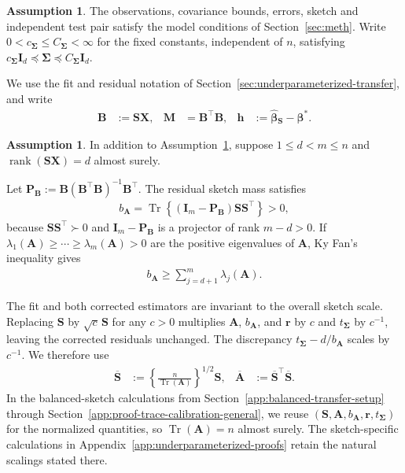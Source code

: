 \documentclass{article}
\theoremstyle{plain}
\theoremstyle{definition}
\newtheorem{assumption}[theorem]{Assumption}
\theoremstyle{definition}
\DeclareMathOperator{\trace}{Tr}
\DeclareMathOperator{\rank}{rank}
\def\mathbold{\boldsymbol}
\def\cal{\mathcal}
\def\bA{\mathbold{A}}\def\calA{{\cal A}}\def\scrA{{\mathscr A}}\def\Ahat{\widehat{A}}\def\Atil{{\widetilde A}}
\def\bB{\mathbold{B}}\def\calB{{\cal B}}\def\scrB{{\mathscr B}}\def\Bhat{\widehat{B}}\def\Btil{{\widetilde B}}
\def\bh{\mathbold{h}}\def\hhat{\widehat{h}}\def\htil{\widetilde{h}}
\def\bI{\mathbold{I}}\def\hbI{{\widehat{\bI}}}\def\tbI{{\widetilde{\bI}}}
\def\bM{\mathbold{M}}\def\hbM{{\widehat{\bM}}}\def\tbM{{\widetilde{\bM}}}
\def\bP{\mathbold{P}}\def\hbP{{\widehat{\bP}}}\def\tbP{{\widetilde{\bP}}}
\def\br{\mathbold{r}}\def\rhat{\widehat{r}}\def\rtil{\widetilde{r}}\def\rbar{{\overline r}}
\def\bS{\mathbold{S}}\def\hbS{{\widehat{\bS}}}\def\tbS{{\widetilde{\bS}}}
\def\bX{\mathbold{X}}\def\hbX{{\widehat{\bX}}}\def\tbX{{\tilde{\bX}}}\def\bXbar{{\overline \bX}}
\def\bbeta{\mathbold{\beta}}\def\betahat{\widehat{\beta}}\def\hbeta{\widehat{\beta}}
\def\hbbeta{\hat{\bbeta}{}}
\def\bSigma{\mathbold{\Sigma}}\def\hbSigma{{\widehat{\bSigma}}}
\begin{document}
\begin{assumption}
\label{assu:model-sketch}
The observations, covariance bounds, errors, sketch and independent test
pair satisfy the model conditions of Section~\ref{sec:meth}. Write
$0<c_{\bSigma}\leq C_{\bSigma}<\infty$ for the fixed constants,
independent of $n$, satisfying
$c_{\bSigma}\bI_d\preceq\bSigma\preceq C_{\bSigma}\bI_d$.
\end{assumption}
We use the fit and residual notation of
Section~\ref{sec:underparameterized-transfer}, and write
\begin{align*}
    \bB&:=\bS\bX,
    &\bM&=\bB^\top\bB,
    &\bh&:=\hbbeta_{\bS}-\bbeta^*.
\end{align*}
\begin{assumption}
\label{assu:noninterpolating}
In addition to Assumption~\ref{assu:model-sketch}, suppose
$1\leq d<m\leq n$ and $\rank(\bS\bX)=d$ almost surely.
\end{assumption}
Let $\bP_{\bB}:=\bB(\bB^\top\bB)^{-1}\bB^\top$.
The residual sketch mass satisfies
\begin{align*}
    b_{\bA}
    =\trace\!\left\{(\bI_m-\bP_{\bB})\bS\bS^\top\right\}>0,
\end{align*}
because $\bS\bS^\top\succ0$ and $\bI_m-\bP_{\bB}$ is a projector
of rank $m-d>0$. If
$\lambda_1(\bA)\geq\cdots\geq\lambda_m(\bA)>0$ are the positive
eigenvalues of $\bA$, Ky Fan's inequality gives
\begin{align}
    b_{\bA}\geq\sum_{j=d+1}^{m}\lambda_j(\bA).
    \label{eq:bA-spectral-lower}
\end{align}

The fit and both corrected estimators are invariant to the overall
sketch scale. Replacing $\bS$ by $\sqrt c\,\bS$ for any $c>0$ multiplies
$\bA$, $b_{\bA}$, and $\br$ by $c$ and $t_{\bSigma}$ by $c^{-1}$,
leaving the corrected residuals unchanged. The discrepancy
$t_{\bSigma}-d/b_{\bA}$ scales by $c^{-1}$. We therefore use
\begin{align*}
    \overline{\bS}
    &:=\left\{\frac{n}{\trace(\bA)}\right\}^{1/2}\bS,
    &\overline{\bA}&:=\overline{\bS}^{\top}\overline{\bS}.
\end{align*}
In the balanced-sketch calculations from
Section~\ref{app:balanced-transfer-setup} through
Section~\ref{app:proof-trace-calibration-general}, we reuse
$(\bS,\bA,b_{\bA},\br,t_{\bSigma})$ for the normalized quantities,
so $\trace(\bA)=n$ almost surely. The sketch-specific calculations in
Appendix~\ref{app:underparameterized-proofs} retain the natural scalings
stated there.
\end{document}
